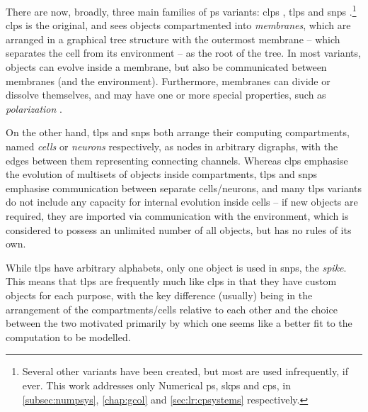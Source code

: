 There are now, broadly, three main families of \gls{ps} variants:  \gls{clps} \cite{Paun2001,Paun2002}, \gls{tlps} \cite{tMaPaPaRo01a,Martin-Vide2003} and \gls{snps} \cite{Ionescu2006}.\footnote{Several other variants have been created, but most are used infrequently, if ever.  This work addresses only Numerical \gls{ps}, \gls{skps} and \gls{cps}, in \autoref{subsec:numpsys}, \autoref{chap:gcol} and \autoref{sec:lr:cpsystems} respectively.}  \Gls{clps} is the original, and sees objects compartmented into \emph{membranes}, which are arranged in a graphical tree structure with the outermost membrane -- which separates the cell from its environment -- as the root of the tree.  In most variants, objects can evolve inside a membrane, but also be communicated between membranes (and the environment).  Furthermore, membranes can divide or dissolve themselves, and may have one or more special properties, such as \emph{polarization} \cite{Paun1999a}.

On the other hand, \gls{tlps} and \gls{snps} both arrange their computing compartments, named \emph{cells} or \emph{neurons} respectively, as nodes in arbitrary digraphs, with the edges between them representing connecting channels.  Whereas \gls{clps} emphasise the evolution of multisets of objects inside compartments, \gls{tlps} and \gls{snps} emphasise communication between separate cells/neurons, and many \gls{tlps} variants do not include any capacity for internal evolution inside cells -- if new objects are required, they are imported via communication with the environment, which is considered to possess an unlimited number of all objects, but has no rules of its own.


While \gls{tlps} have arbitrary alphabets, only one object is used in \gls{snps}, the \emph{spike}.  This means that \gls{tlps} are frequently much like \gls{clps} in that they have custom objects for each purpose, with the key difference (usually) being in the arrangement of the compartments/cells relative to each other and the choice between the two motivated primarily by which one seems like a better fit to the computation to be modelled.

